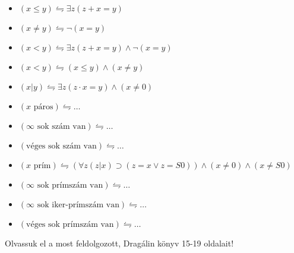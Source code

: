 \documentclass{article}
\begin{document}
\begin{itemize}
\item
$ (x \le y) \leftrightharpoons \exists z(z+x=y)$ 

\item
$ (x \neq y) \leftrightharpoons  \neg (x=y)$ 

\item
$ (x < y) \leftrightharpoons \exists z(z+x=y) \wedge \neg (x=y)$ 

\item
$ (x < y) \leftrightharpoons  (x \le y )\wedge ( x \neq y)$ 

\item
$(x \vert y) \leftrightharpoons \exists z ( z \cdot x=y )\wedge ( x \neq 0)$ 

\item
$ (x \text{ páros}) \leftrightharpoons \dots$ 

\item
$ (\infty \text{ sok szám van}) \leftrightharpoons \dots$ 

\item
$ (\text{véges sok szám van}) \leftrightharpoons \dots$ 

\item
$ (x \text{ prím}) \leftrightharpoons  (\forall z( z \vert x )\supset ( z = x \vee z=S0))\wedge ( x \neq 0)\wedge ( x \neq S0)$ 

\item
$ (\infty \text{ sok prímszám van}) \leftrightharpoons  \dots $ 

\item
$ (\infty \text{ sok iker-prímszám van}) \leftrightharpoons  \dots $ 

\item
$ (\text{véges sok prímszám van}) \leftrightharpoons  \dots $ 


 \end{itemize}

Olvassuk el a most feldolgozott, Dragálin könyv 15-19 oldalait!
\end{document}

